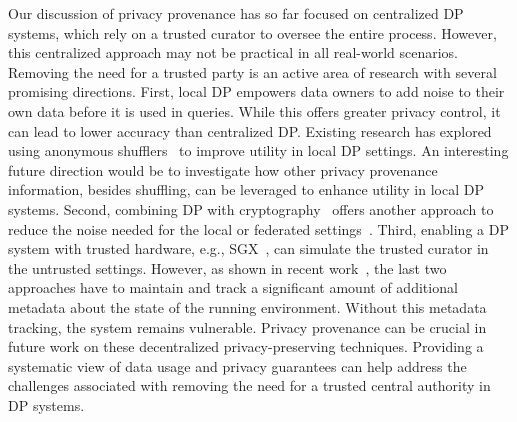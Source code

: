 Our discussion of privacy provenance has so far focused on centralized DP systems, which rely on a trusted curator to oversee the entire process. However, this centralized approach may not be practical in all real-world scenarios. Removing the need for a trusted party is an active area of research with several promising directions. First, local DP empowers data owners to add noise to their own data before it is used in queries. While this offers greater privacy control, it can lead to lower accuracy than centralized DP. Existing research has explored using anonymous shufflers~\cite{bittau2017prochlo,girgis2021renyi} to improve utility in local DP settings.  An interesting future direction would be to investigate how other privacy provenance information, besides shuffling, can be leveraged to enhance utility in local DP systems. Second, combining DP with cryptography~\cite{wagh2021dp,roy2020cryptϵ} offers another approach to reduce the noise needed for the local or federated settings~\cite{bonawitz2017practical,bao2022skellam}. Third,
enabling a DP system with trusted hardware, e.g., SGX~\cite{duetsgx}, can simulate the trusted curator in the untrusted settings. However, as shown in recent work~\cite{state_sgx}, the last two approaches have to maintain and track a significant amount of additional metadata about the state of the running environment. Without this metadata tracking, the system remains vulnerable.
Privacy provenance can be crucial in future work on these decentralized privacy-preserving techniques. Providing a systematic view of data usage and privacy guarantees can help address the challenges associated with removing the need for a trusted central authority in DP systems.

